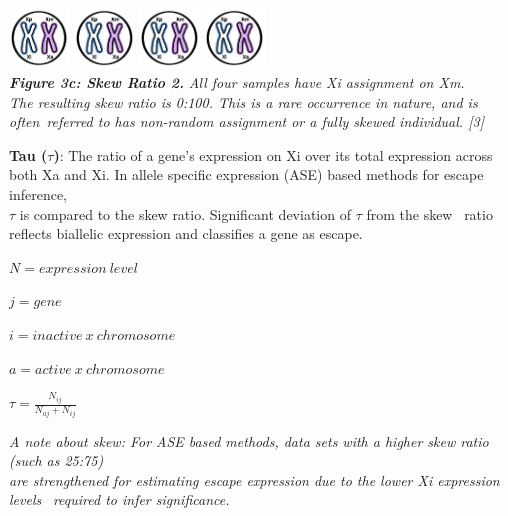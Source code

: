 \documentclass[
]{article}
\begin{document}
\includegraphics[width=0.12\textwidth,height=\textheight]{images/XCI-images/Slide5.png}
\includegraphics[width=0.12\textwidth,height=\textheight]{images/XCI-images/Slide5.png}
\includegraphics[width=0.12\textwidth,height=\textheight]{images/XCI-images/Slide5.png}
\includegraphics[width=0.12\textwidth,height=\textheight]{images/XCI-images/Slide5.png}\\
\textbf{\emph{Figure 3c: Skew Ratio 2.}} \emph{All four samples have Xi
assignment on Xm.}\\
\emph{The resulting skew ratio is 0:100. This is a rare occurrence in
nature, and is often}~\emph{referred to has non-random assignment or a
fully skewed individual. {[}3{]}}

\textbf{Tau (\(\tau\))}: The ratio of a gene's expression on Xi over its
total expression across\\
both Xa and Xi. In allele specific expression (ASE) based methods for
escape inference,\\
\(\tau\) is compared to the skew ratio. Significant deviation of
\(\tau\) from the skew~ ratio reflects biallelic expression and
classifies a gene as escape.

\(N=expression\ level\)

\(j=gene\)

\(i=inactive\ x\ chromosome\)

\(a=active\ x\ chromosome\)

\(\tau = \frac{N_{ij}}{N_{aj} + N_{ij}}\)

\emph{A note about skew: For ASE based methods, data sets with a higher
skew ratio (such as 25:75)}\\
\emph{are strengthened for estimating escape expression due to the lower
Xi expression levels}~ \emph{required to infer significance.}
\end{document}

